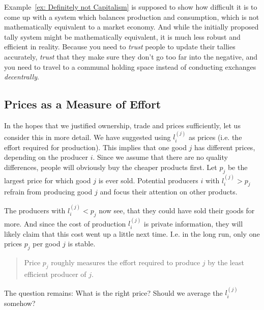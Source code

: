 \begin{remark}
	Example~\ref{ex: Definitely not Capitalism} is supposed to show how difficult
	it is to come up with a system which balances production and consumption,
	which is not mathematically equivalent to a market economy. And while the
	initially proposed tally system might be mathematically equivalent, it is
	much less robust and efficient in reality. Because you need to \emph{trust}
	people to update their tallies accurately, \emph{trust} that they make sure
	they don't go too far into the negative, and you need to travel to a
	communal holding space instead of conducting exchanges \emph{decentrally}.
\end{remark}

\subsection{Prices as a Measure of Effort}

In the hopes that we justified ownership, trade and prices sufficiently, let us
consider this in more detail. We have suggested using \(l^{(j)}_i\) as prices
(i.e. the effort required for production).  This implies that one good \(j\) has
different prices, depending on the producer \(i\). Since we assume that there
are no quality differences, people will obviously buy the cheaper products
first. Let \(p_j\) be the largest price for which good \(j\) is ever sold.
Potential producers \(i\) with \(l^{(j)}_i > p_j\) refrain from producing good
\(j\) and focus their attention on other products.

The producers with \(l^{(j)}_i < p_j\) now see, that they could have sold their
goods for more. And since the cost of production \(l^{(j)}_i\) is private
information, they will likely claim that this cost went up a little next time.
I.e. in the long run, only one prices \(p_j\) per good \(j\) is stable.
\begin{quotation}
\noindent Price \(p_j\) roughly measures the effort required to produce \(j\) by
the least efficient producer of \(j\).
\end{quotation}

The question remains: What is the right price? Should we average the
\(l^{(j)}_i\) somehow?

